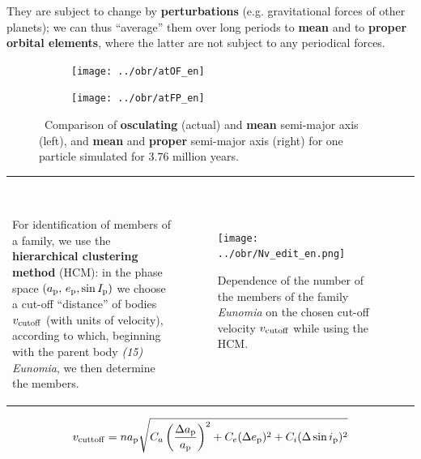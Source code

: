 \documentclass{beamer}
\newlength{\vyska}
\newlength{\vyskaA}
\newlength{\side}
\begin{document}
\begin{frame}
\begin{columns}[t]
\begin{column}{\side}
\begin{tcolorbox}[title=Methods of celestial mechanics\vphantom{Úy},height=0.665\vyskaA]
\vspace{1cm}

They are subject to change by \textbf{perturbations} (e.g. gravitational forces of other planets); we can thus \enquote{average} them over long periods to \textbf{mean} and to \textbf{proper orbital elements}, where the latter are not subject to any periodical forces.

		\vspace{1.0cm}

		\begin{figure}
			\centering
			\begin{subfigure}[b]{0.49\textwidth}
			\centering
			\texttt{[image: ../obr/atOF\_en]}
			\end{subfigure}
			\begin{subfigure}[b]{0.49\textwidth}
			\centering
			\texttt{[image: ../obr/atFP\_en]}
			\end{subfigure}
			\caption{\ Comparison of \textbf{osculating} (actual) and \textbf{mean} semi-major axis (left), and \textbf{mean} and \textbf{proper} semi-major axis (right) for one particle simulated for $3.76$ million years.}
		\end{figure}
		\begin{tabularx}{\textwidth}{p{12cm}X}

		\

		For identification of members of a family, we use the \textbf{hierarchical clustering method} (HCM): in the phase space  $(a_{\rm p},\,e_{\rm p},\sin I_{\rm p})$ we choose a cut-off \enquote{distance} of bodies $v_{\rm cutoff}$ (with units of velocity), according to which, beginning with the parent body \textit{(15) Eunomia}, we then determine the members.
		&
		\begin{figure}
			\centering
			\texttt{[image: ../obr/Nv\_edit\_en.png]}
			\caption{Dependence of the number of the members of the family \textit{Eunomia} on the chosen cut-off velocity $v_{\rm cutoff}$ while using the HCM.}
		\end{figure}
		\end{tabularx}
		\vspace{-0.5cm}
		{\begin{align*}
			v_{\rm cuttoff}=na_{\rm p}\sqrt{C_a\left(\frac{\Delta a_{\rm p}}{a_{\rm p}}\right)^2+C_e(\Delta e_{\rm p})^2+C_i(\Delta \sin i_{\rm p})^2}
		\end{align*}}

	\end{tcolorbox}


\end{column}
\end{columns}
\end{frame}
\end{document}
